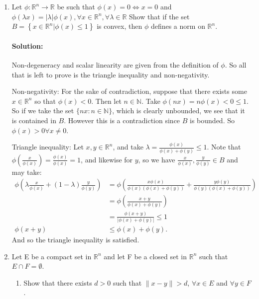 \documentclass{article}
\begin{document}
\begin{enumerate} 

\item Let $\phi : \mathbb{R}^n \to \mathbb{R}$ be such that $\phi(x) = 0 \Leftrightarrow x = 0$ and $\phi(\lambda x) = |\lambda| \phi(x), \forall x \in \mathbb{R}^n, \forall \lambda \in \mathbb{R}$  Show that if the set $B = \left\{x \in \mathbb{R}^n | \phi(x) \leq 1 \right\}$ is convex, then $\phi$ defines a norm on $\mathbb{R}^n$. 
\paragraph{Solution: }Non-degeneracy and scalar linearity are given from the definition of $\phi$. So all that is left to prove is the triangle inequality and non-negativity.

Non-negativity: For the sake of contradiction, suppose that there exists some $x\in \mathbb{R}^{n}$ so that $\phi(x)<0$. Then let $n\in \mathbb{N}$. Take $\phi(nx)=n\phi(x)<0\leq 1$. So if we take the set $\{nx:n\in \mathbb{N}\} $, which is clearly unbounded, we see that it is contained in $B$. However this is a contradiction since $B$ is bounded. So $\phi(x)>0\forall x\neq 0$.

Triangle inequality: Let $x,y\in \mathbb{R}^{n}$, and take $\lambda= \frac{\phi(x)}{\phi(x)+\phi(y)}\leq 1$. Note that $\phi\left( \frac{x}{\phi(x)} \right) =\frac{\phi (x)}{\phi(x)}=1$, and likewise for $y$, so we have $\frac{x}{\phi(x)},\frac{y}{\phi(y)}\in B$ and may take:
\begin{align*}
    \phi\left( \lambda \frac{x}{\phi(x)}+(1-\lambda) \frac{y}{\phi(y)} \right) 
    &= \phi\left(  \frac{x\phi(x)}{\phi(x)(\phi(x)+\phi(y))}+ \frac{y\phi(y)}{\phi(y)(\phi(x)+\phi(y))}\right)  \\
    &= \phi\left( \frac{x+y}{\phi(x)+\phi(y)} \right)  \\
    &= \frac{\phi(x+y)}{|\phi(x)+\phi(y)|}\leq 1 \\
    \phi(x+y)&\leq\phi(x)+\phi(y)
.\end{align*}
And so the triangle inequality is satisfied.

\item Let E be a compact set in $\mathbb{R}^n$ and let F be a closed set in $\mathbb{R}^n$ such that $E \cap F = \emptyset$.  

\begin{enumerate}[label= (\alph*)] 
    \item Show that there exists $d > 0$ such that $\|x - y\| > d$, $\forall x \in E$ and $\forall y \in F$.  

\end{enumerate}
\end{enumerate}
\end{document}
